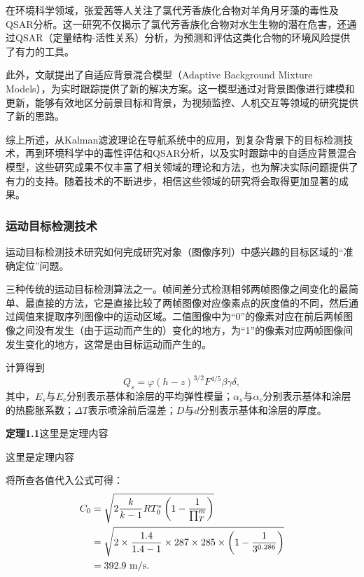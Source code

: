 在环境科学领域，张爱茜等人关注了氯代芳香族化合物对羊角月牙藻的毒性及QSAR分析。这一研究不仅揭示了氯代芳香族化合物对水生生物的潜在危害，还通过QSAR（定量结构-活性关系）分析，为预测和评估这类化合物的环境风险提供了有力的工具。

此外，文献\cite{Stauffer1999}提出了自适应背景混合模型（Adaptive Background Mixture Models），为实时跟踪提供了新的解决方案。这一模型通过对背景图像进行建模和更新，能够有效地区分前景目标和背景，为视频监控、人机交互等领域的研究提供了新的思路。

综上所述，从Kalman滤波理论在导航系统中的应用，到复杂背景下的目标检测技术，再到环境科学中的毒性评估和QSAR分析，以及实时跟踪中的自适应背景混合模型，这些研究成果不仅丰富了相关领域的理论和方法，也为解决实际问题提供了有力的支持。随着技术的不断进步，相信这些领域的研究将会取得更加显著的成果。

\subsubsection{运动目标检测技术}

运动目标检测技术研究如何完成研究对象（图像序列）中感兴趣的目标区域的“准确定位”问题。


三种传统的运动目标检测算法之一。帧间差分式检测相邻两帧图像之间变化的最简单、最直接的方法，它是直接比较了两帧图像对应像素点的灰度值的不同，然后通过阈值来提取序列图像中的运动区域。二值图像中为“$0$”的像素对应在前后两帧图像之间没有发生（由于运动而产生的）变化的地方，为“1”的像素对应两帧图像间发生变化的地方，这常是由目标运动而产生的。

计算得到
\begin{equation}%
Q_s = \varphi(h-z)^{3/2}F^{4/5}\beta\gamma\delta,
\end{equation}
其中，$E_s$与$E_c$分别表示基体和涂层的平均弹性模量；$\alpha_s$与$\alpha_c$分别表示基体和涂层的热膨胀系数；$\Delta T$表示喷涂前后温差；$D$与$d$分别表示基体和涂层的厚度。

{\bf 定理1.1}\quad 这里是定理内容 %
\begin{Theorem}
这里是定理内容
\end{Theorem}

将所查各值代入公式可得：
\begin{align}%
  C_0 &= \sqrt{ 2\frac{k}{k-1}RT_0^{\ast}\lt(1-\frac{1}{\prod_{T}^{m}}\rt) } \notag \\
   &= \sqrt{ 2\times \frac{1.4}{1.4-1}\times 287\times 285\times \lt( 1-\frac{1}{3^{0.286}} \rt) } \notag \\
   &= 392.9~\unit{m/s}.
\end{align}

